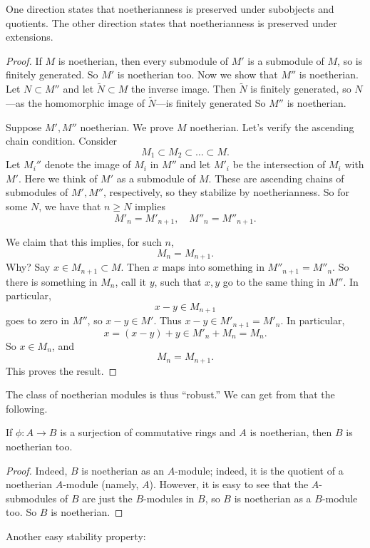 One direction states that noetherianness is preserved under subobjects and
quotients. The other direction states that noetherianness is preserved under
extensions. 
\begin{proof} 
If $M$ is noetherian, then every submodule of $M'$ is a submodule of $M$, so is
finitely generated. So $M'$ is noetherian too. Now we show that $M''$ is
noetherian. Let $N \subset M''$ and let
$\widetilde{N} \subset M$ the inverse image. Then $\widetilde{N}$ is finitely generated, so
$N$---as the homomorphic image of $\widetilde{N}$---is finitely generated 
So $M''$ is noetherian.

Suppose $M', M''$ noetherian. We prove $M$ noetherian.
Let's verify the ascending chain condition. Consider
\[ M_1 \subset M_2 \subset \dots \subset M.  \]
Let $M_i''$ denote the image of $M_i$ in $M''$ and let $M'_i$ be the
intersection of $M_i$ with $M'$. Here we think of $M'$ as a submodule of $M$.
These are ascending chains of submodules of $M', M''$, respectively, so they
stabilize by noetherianness.
So for some $N$, we have
that $n \geq N$ implies 
\[ M'_n = M'_{n+1}, \quad M''_n = M''_{n+1}.  \]

We claim that this implies, for such $n$, 
\[ M_n = M_{n+1}.  \]
Why? Say $x \in M_{n+1} \subset M$. Then $x$ maps into something in $M''_{n+1} = M''_n$.  
So there is something in $M_n$, call it $y$, such that $x,y$ go to the same
thing in $M''$. In particular, 
\[ x - y \in M_{n+1} \]
goes to zero in $M''$, so $x-y \in M'$. Thus $x-y \in M'_{n+1} = M'_n$. In
particular, 
\[ x = (x-y) + y \in M'_n + M_n = M_n.  \]
So $x \in M_n$, and 
\[ M_n = M_{n+1} . \]
This proves the result.
\end{proof} 

The class of noetherian modules is thus ``robust.'' We can get from that the
following.

\begin{proposition} 
If $\phi: A \to B$ is a surjection of commutative rings and $A$ is noetherian, then $B$ is
noetherian too.
\end{proposition} 
\begin{proof} 
Indeed, $B$ is noetherian as an $A$-module; indeed, it is the quotient of a
noetherian $A$-module (namely, $A$). However, it is easy to see that the
$A$-submodules of $B$ are just the $B$-modules in $B$, so $B$ is noetherian as a
$B$-module too. So $B$ is noetherian.  
\end{proof} 

Another easy stability property:

